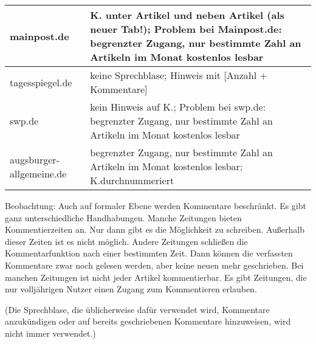 \begin{landscape}
\begin{longtable}{l|p{170mm}}
mainpost.de		& K. unter Artikel und neben Artikel (als neuer Tab!); Problem bei Mainpost.de: begrenzter Zugang, nur bestimmte Zahl an Artikeln im Monat kostenlos lesbar\\\hline
tagesspiegel.de		& keine Sprechblase; Hinweis mit [Anzahl + Kommentare]\\\hline
swp.de			& kein Hinweis auf K.; Problem bei swp.de: begrenzter Zugang, nur bestimmte Zahl an Artikeln im Monat kostenlos lesbar\\\hline
augsburger-allgemeine.de	& begrenzter Zugang, nur bestimmte Zahl an Artikeln im Monat kostenlos lesbar; K.durchnummeriert
\\ \hline               

\end{longtable}
\end{landscape}

Beobachtung:
Auch auf formaler Ebene werden Kommentare beschränkt. Es gibt ganz unterschiedliche Handhabungen. Manche Zeitungen bieten Kommentierzeiten an. Nur dann gibt es die Möglichkeit zu schreiben. Außerhalb dieser Zeiten ist es nicht möglich. Andere Zeitungen schließen die Kommentarfunktion nach einer bestimmten Zeit. Dann können die verfassten Kommentare zwar noch gelesen werden, aber keine neuen mehr geschrieben. Bei manchen Zeitungen ist nicht jeder Artikel kommentierbar. Es gibt Zeitungen, die nur volljährigen Nutzer einen Zugang zum Kommentieren erlauben. 


(Die Sprechblase, die üblicherweise dafür verwendet wird, Kommentare anzukündigen oder auf bereits geschriebenen Kommentare hinzuweisen, wird nicht immer verwendet.)

